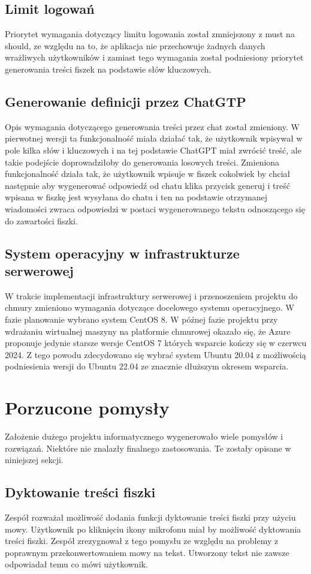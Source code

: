 \subsection{Limit logowań}
Priorytet wymagania dotyczący limitu logowania został zmniejszony z must na should, ze względu na to, że aplikacja nie przechowuje żadnych danych wrażliwych użytkowników i zamiast tego wymagania został podniesiony priorytet generowania treści fiszek na podstawie słów kluczowych.

\subsection{Generowanie definicji przez ChatGTP}
Opis wymagania dotyczącego generowania treści przez chat został zmieniony. W pierwotnej wersji ta funkcjonalność miała działać tak, że użytkownik wpisywał w pole kilka słów i kluczowych i na tej podstawie ChatGPT miał zwrócić treść, ale takie podejście doprowadziłoby do generowania losowych treści. Zmieniona funkcjonalność działa tak, że użytkownik wpisuje w fiszek cokolwiek by chciał następnie aby wygenerować odpowiedź od chatu klika przycisk generuj i treść wpisana w fiszkę jest wysyłana do chatu i ten na podstawie otrzymanej wiadomości zwraca odpowiedzi w postaci wygenerowanego tekstu odnoszącego się do zawartości fiszki.

\subsection{System operacyjny w infrastrukturze serwerowej}
W trakcie implementacji infrastruktury serwerowej i przenoszeniem projektu do chmury zmieniono wymagania dotyczące docelowego systemu operacyjnego. W fazie planowanie wybrano system CentOS 8. W późnej fazie projektu przy wdrażaniu wirtualnej maszyny na platformie chmurowej okazało się, że Azure proponuje jedynie starsze wersje CentOS 7 których wsparcie kończy się w czerwcu 2024. Z tego powodu zdecydowano się wybrać system Ubuntu 20.04 z możliwością podniesienia wersji do Ubuntu 22.04 ze znacznie dłuższym okresem wsparcia.


\section{Porzucone pomysły}
Założenie dużego projektu informatycznego wygenerowało wiele pomysłów i rozwiązań. Niektóre nie znalazły finalnego zastosowania. Te zostały opisane w niniejszej sekcji.

\subsection{Dyktowanie treści fiszki}
Zespół rozważał możliwość dodania funkcji dyktowanie treści fiszki przy użyciu mowy. Użytkownik po kliknięciu ikony mikrofonu miał by możliwość dyktowania treści fiszki. Zespół zrezygnował z tego pomysłu ze względu na problemy z poprawnym przekonwertowaniem mowy na tekst. Utworzony tekst nie zawsze odpowiadał temu co mówi użytkownik.

